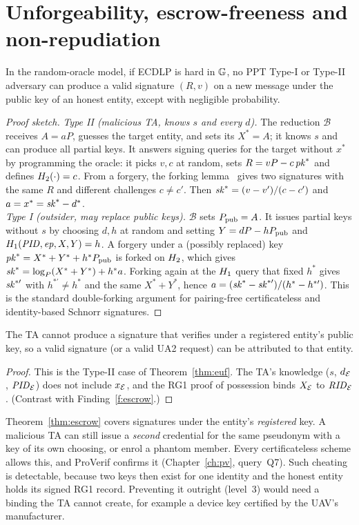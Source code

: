 \section{Unforgeability, escrow-freeness and non-repudiation}
\begin{theorem}\label{thm:euf}
In the random-oracle model, if ECDLP is hard in $\mathbb{G}$, no PPT Type-I or Type-II adversary can produce a valid signature $(R,v)$ on a new message under the
public key of an honest entity, except with negligible probability.
\end{theorem}
\begin{proof}[Proof sketch]
\emph{Type II (malicious TA, knows $s$ and every $d$).} The reduction $\mathcal{B}$ receives $A=aP$, guesses the target entity, and sets its
$X^*=A$; it knows $s$ and can produce all partial keys. It answers signing queries for the target without $x^*$ by programming the oracle: it picks
$v,c$ at random, sets $R=vP-c\,\mathit{pk}^*$ and defines $H_2(\cdot)=c$. From a forgery, the forking lemma~\cite{forking} gives two signatures with the same $R$ and
different challenges $c\ne c'$. Then $\mathit{sk}^*=(v-v')/(c-c')$ and $a=x^*=\mathit{sk}^*-d^*$.\\
\emph{Type I (outsider, may replace public keys).} $\mathcal{B}$ sets $P_{\mathrm{pub}}=A$. It issues partial keys without $s$ by choosing $d,h$ at random and setting
$Y=dP-hP_{\mathrm{pub}}$ and $H_1(\mathit{PID},\mathit{ep},X,Y)=h$. A forgery under a (possibly replaced) key $\mathit{pk}^*=X^*+Y^*+h^*P_{\mathrm{pub}}$ is forked on $H_2$, which gives
$\mathit{sk}^*=\log_P(X^*+Y^*)+h^*a$. Forking again at the $H_1$ query that fixed $h^*$ gives $\mathit{sk}^{*\prime}$ with $h^{*\prime}\ne h^*$ and the same $X^*+Y^*$, hence
$a=(\mathit{sk}^*-\mathit{sk}^{*\prime})/(h^*-h^{*\prime})$. This is the standard double-forking argument for pairing-free certificateless and identity-based Schnorr signatures.
\end{proof}

\begin{theorem}\label{thm:escrow}
The TA cannot produce a signature that verifies under a registered entity's public key, so a valid signature (or a valid UA2 request) can be attributed to that entity.
\end{theorem}
\begin{proof}
This is the Type-II case of Theorem~\ref{thm:euf}. The TA's knowledge ($s$, $d_{\mathcal{E}}$, $\mathit{PID}_{\mathcal{E}}$) does not include $x_{\mathcal{E}}$, and the RG1 proof of possession binds
$X_{\mathcal{E}}$ to $\mathit{RID}_{\mathcal{E}}$. (Contrast with Finding~\ref{f:escrow}.)
\end{proof}
\begin{limitbox}[title={Exact scope of escrow-freeness (Girault level 2)}]
Theorem~\ref{thm:escrow} covers signatures under the entity's \emph{registered} key. A malicious TA can still issue a \emph{second} credential for the same
pseudonym with a key of its own choosing, or enrol a phantom member. Every certificateless scheme allows this, and ProVerif confirms it (Chapter~\ref{ch:pv},
query~Q7). Such cheating is detectable, because two keys then exist for one identity and the honest entity holds its signed RG1 record. Preventing it
outright (level~3) would need a binding the TA cannot create, for example a device key certified by the UAV's manufacturer.
\end{limitbox}

